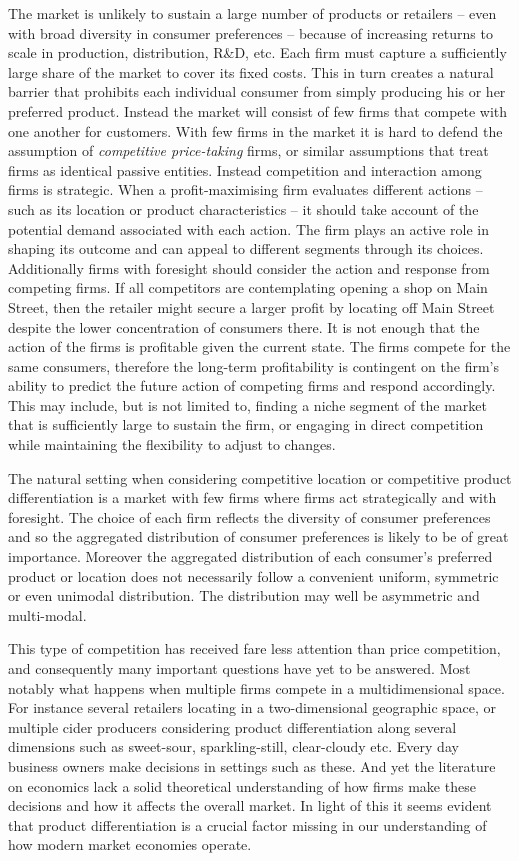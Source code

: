 \documentclass[preprint, 12pt]{elsarticle}
\begin{document}
The market is unlikely to sustain a large number of products or retailers -- even with broad diversity in consumer preferences -- because of increasing returns to scale in production, distribution, R\&D, etc. Each firm must capture a sufficiently large share of the market to cover its fixed costs. This in turn creates a natural barrier that prohibits each individual consumer from simply producing his or her preferred product. Instead the market will consist of few firms that compete with one another for customers. With few firms in the market it is hard to defend the assumption of \emph{competitive price-taking} firms, or similar assumptions that treat firms as identical passive entities. Instead competition and interaction among firms is strategic. When a profit-maximising firm evaluates different actions -- such as its location or product characteristics -- it should take account of the potential demand associated with each action. The firm plays an active role in shaping its outcome and can appeal to different segments through its choices. Additionally firms with foresight should consider the action and response from competing firms. If all competitors are contemplating opening a shop on Main Street, then the retailer might secure a larger profit by locating off Main Street despite the lower concentration of consumers there. It is not enough that the action of the firms is profitable given the current state. The firms compete for the same consumers, therefore the long-term profitability is contingent on the firm's ability to predict the future action of competing firms and respond accordingly. This may include, but is not limited to, finding a niche segment of the market that is sufficiently large to sustain the firm, or engaging in direct competition while maintaining the flexibility to adjust to changes.

The natural setting when considering competitive location or competitive product differentiation is a market with few firms where firms act strategically and with foresight. The choice of each firm reflects the diversity of consumer preferences and so the aggregated distribution of consumer preferences is likely to be of great importance. Moreover the aggregated distribution of each consumer's preferred product or location does not necessarily follow a convenient uniform, symmetric or even unimodal distribution. The distribution may well be asymmetric and multi-modal.

This type of competition has received fare less attention than price competition, and consequently many important questions have yet to be answered. Most notably what happens when multiple firms compete in a multidimensional space. For instance several retailers locating in a two-dimensional geographic space, or multiple cider producers considering product differentiation along several dimensions such as sweet-sour, sparkling-still, clear-cloudy etc. Every day business owners make decisions in settings such as these. And yet the literature on economics lack a solid theoretical understanding of how firms make these decisions and how it affects the overall market. In light of this it seems evident that product differentiation is a crucial factor missing in our understanding of how modern market economies operate.
\end{document}
